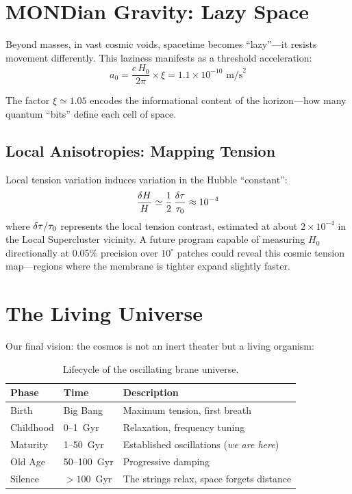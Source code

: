 \section{MONDian Gravity: Lazy Space}
\label{sec:mond_chronology}

Beyond masses, in vast cosmic voids, spacetime becomes ``lazy''---it resists movement differently. This laziness manifests as a threshold acceleration:
\begin{equation}
a_0 = \frac{c\,H_0}{2\pi} \times \xi = 1.1 \times 10^{-10}\text{ m/s}^2
\end{equation}

The factor $\xi \simeq 1.05$ encodes the informational content of the horizon---how many quantum ``bits'' define each cell of space.

\subsection{Local Anisotropies: Mapping Tension}

Local tension variation induces variation in the Hubble ``constant'':
\begin{equation}
\frac{\delta H}{H} \simeq \frac{1}{2}\,\frac{\delta\tau}{\tau_0} \approx 10^{-4}
\end{equation}
where $\delta\tau/\tau_0$ represents the local tension contrast, estimated at about $2 \times 10^{-4}$ in the Local Supercluster vicinity. A future program capable of measuring $H_0$ directionally at 0.05\% precision over $10^\circ$ patches could reveal this cosmic tension map---regions where the membrane is tighter expand slightly faster.

\section{The Living Universe}
\label{sec:living_universe}

Our final vision: the cosmos is not an inert theater but a living organism:

\begin{table}[h]
\centering
\caption{Lifecycle of the oscillating brane universe.}
\label{tab:lifecycle}
\begin{tabular}{@{}lll@{}}
\toprule
\textbf{Phase} & \textbf{Time} & \textbf{Description} \\
\midrule
Birth & Big Bang & Maximum tension, first breath \\
Childhood & 0--1~Gyr & Relaxation, frequency tuning \\
Maturity & 1--50~Gyr & Established oscillations (\emph{we are here}) \\
Old Age & 50--100~Gyr & Progressive damping \\
Silence & $> 100$~Gyr & The strings relax, space forgets distance \\
\bottomrule
\end{tabular}
\end{table}

